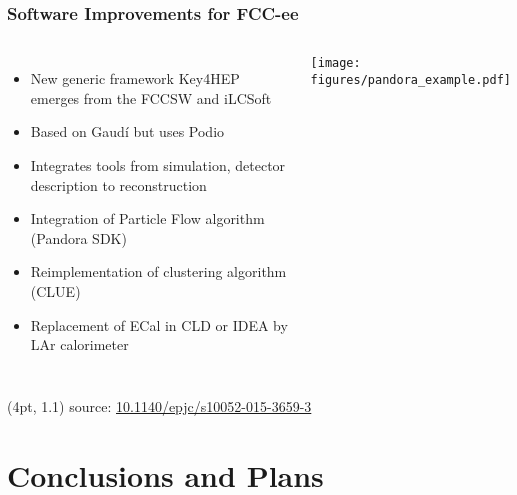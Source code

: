 \documentclass[aspectratio=169]{beamer}
\begin{document}
\begin{frame}
  \frametitle{Software Improvements for FCC-ee}

  \begin{columns}[c]
    \begin{itemize}
      \item New generic framework Key4HEP emerges from the FCCSW and iLCSoft
      \item Based on Gaudí but uses Podio
      \item Integrates tools from simulation, detector description to
            reconstruction
      \item Integration of Particle Flow algorithm (Pandora SDK)
      \item Reimplementation of clustering algorithm (CLUE)
      \item Replacement of ECal in CLD or IDEA by LAr calorimeter
    \end{itemize}

    \begin{center}
      \texttt{[image: figures/pandora\_example.pdf]}
    \end{center}
  \end{columns}

  \begin{textblock*}{\paperwidth}(4pt, 1.1\textheight)
    \tiny source:
    \href{https://doi.org/10.1140/epjc/s10052-015-3659-3}
         {10.1140/epjc/s10052-015-3659-3}
  \end{textblock*}
\end{frame}

%
%
\section{Conclusions and Plans}
\end{document}
